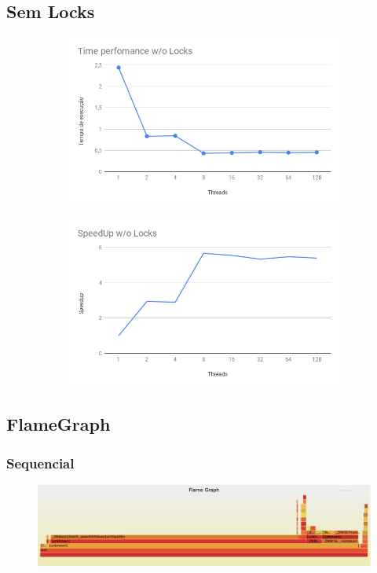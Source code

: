 \documentclass{article}
\begin{document}
\subsection{Sem Locks}
\begin{figure}[!htb]
  \centering
  \begin{subfigure}{.5\textwidth}
    \centering
    \includegraphics[width=.9\linewidth]{Charts/Time_perfomance_w_o_Locks.png}

  \end{subfigure}%
  \begin{subfigure}{.5\textwidth}
    \centering
    \includegraphics[width=.9\linewidth]{Charts/SpeedUp_w_o_Locks.png}
  \end{subfigure}
\end{figure}


\subsection{FlameGraph}

\subsubsection{Sequencial}
\begin{figure}[!htb]
  \centering
  \includegraphics[width=.9\linewidth]{seq.png}
\end{figure}
\end{document}
